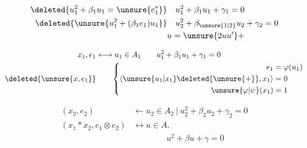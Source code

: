 \[
\begin{aligned}
\deleted{u_1^2+\beta_1u_1=\unsure{e_1^*}}&\quad u_1^2+\beta_1u_1+\gamma_1=0\\
\deleted{\unsure{u_1^2+(\beta_1 e_1)u_1}}&\quad u_2^2+\beta_{\unsure{1|2}}u_2+\gamma_2=0\\
&u=\unsure{2uu'}+
\end{aligned}
\]

\[
\begin{aligned}
 x_1,e_1&\longleftrightarrow u_1\in A_1 \qquad u_1^2+\beta_1u_1+\gamma_1=0\\
 \deleted{\unsure{x,e_1}}&\qquad
 \left\{\begin{aligned}
 e_1&=\varphi(u_1)\\
 \langle\unsure{u_1|x_1}\deleted{\unsure{+}},x_1\rangle&=0\\
 \unsure{\varphi|\psi}(x_1)&=1
 \end{aligned}\right.
\end{aligned}
\]

\[
\begin{aligned}
(x_2,e_2)&\longleftarrow u_2\in A_2\ \big|\ u_2^2+\beta_2u_2+\gamma_2=0\\
(x_1*x_2,e_1\otimes e_2)&\longleftrightarrow u\in A.\\
&\hspace{4em}u^2+\beta u+\gamma=0
\end{aligned}
\]

